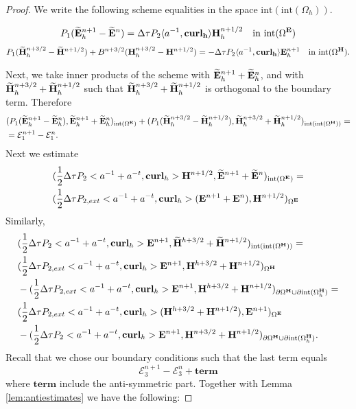 \documentclass[12pt,reqno]{amsart}
\newcommand{\curl}{{\bf curl}}
\newcommand{\acurl}{\langle a^{-1},{\bf curl_h}\rangle}
\newcommand{\e}{{\bf E}}
\newcommand{\h}{{\bf H}}
\theoremstyle{definition}
\numberwithin{equation}{section}
\newcommand{\intr}[1]{\mathrm{int}(#1)}
\def\Gw{\Omega}     \def\Gx{\Xi}         \def\Gy{\Psi}
\def\Gwh{\Omega_h}
\begin{document}
\begin{proof}
	
	We write the following scheme equalities in the space $\intr{\intr\Gwh}$.
	
	\begin{align}
		P_1(\widetilde{\e}_h^{n+1} -\widetilde{\e}^{n})=
		\Delta \tau P_2 \acurl \h_h^{n+1/2} \quad \mathrm{in} \  \intr{\Gw^\e}
	\end{align}
	\begin{align}
		P_1(\widetilde{\h}_h^{n+3/2} -\widetilde{\h}^{n+1/2})+
		B^{n+3/2}(\h_h^{n+3/2} -\h^{n+1/2})
		=
		-\Delta \tau P_2 \acurl \e_h^{n+1}  \quad \mathrm{in} \  \intr{\Gw^\h}.
	\end{align}
	

	
	Next, we take inner products of the scheme with $\widetilde{\e}_h^{n+1}+\widetilde{\e}_h^n$,
	and with 
	$\widetilde{\h}_h^{n+3/2}+\widetilde{\h}_h^{n+1/2}$ such that 
	$\widetilde{\h}_h^{n+3/2}+\widetilde{\h}_h^{n+1/2}$ is orthogonal to the boundary term.
	 Therefore
	\begin{align*}
		&
		(P_1(\widetilde{\e}^{n+1}_h-\widetilde{\e}^{n}_h),\widetilde{\e}^{n+1}_h+\widetilde{\e}^{n}_h)_{\intr{\Gw^\e}}+
		(P_1(\widetilde{\h}^{n+3/2}_h-\widetilde{\h}^{n+1/2}_h),\widetilde{\h}^{n+3/2}_h+\widetilde{\h}^{n+1/2}_h)_{\intr{\intr{\Gw^\h}}}=\\&
		=\mathcal{E}_1^{n+1}-\mathcal{E}_1^{n}.
	\end{align*}
	Next we estimate
	\begin{align*}
		&
		(\frac{1}{2}\Delta \tau P_2<a^{-1}+a^{-t},\curl_h>\h^{n+1/2},\widetilde{\e}^{n+1}+\widetilde{\e}^{n})_{ \intr{\Gw^\e}}=\\&
		(\frac{1}{2}\Delta \tau P_{2,ext}<a^{-1}+a^{-t},\curl_h>(\e^{n+1}+\e^{n}),\h^{n+1/2})_{ {\Gw^\e}}
	\end{align*}
	Similarly,
	\begin{align*}
		&
		(\frac{1}{2}\Delta \tau P_2<a^{-1}+a^{-t},\curl_h>\e^{n+1},\widetilde{\h}^{h+3/2}+\widetilde{\h}^{n+1/2})_{\intr{\intr{\Gw^\h}}}=\\&
		(\frac{1}{2}\Delta \tau P_{2,ext}<a^{-1}+a^{-t},\curl_h>\e^{n+1},\h^{h+3/2}+\h^{n+1/2})_{{\Gw^\h}}
		\\&
		-(\frac{1}{2}\Delta \tau P_{2,ext}<a^{-1}+a^{-t},\curl_h>\e^{n+1},\h^{h+3/2}+\h^{n+1/2})_{\partial{\Gw^\h}\cup \partial \intr{\Gwh^\h}}=\\&
		(\frac{1}{2}\Delta \tau P_{2,ext}<a^{-1}+a^{-t},\curl_h>(\h^{h+3/2}+\h^{n+1/2}),\e^{n+1})_{{{\Gw^\e}}}
		\\&
		-(\frac{1}{2}\Delta \tau P_{2}<a^{-1}+a^{-t},\curl_h>\e^{n+1},\h^{n+3/2}+\h^{n+1/2})_{\partial{\Gw^\h}\cup \partial \intr{\Gwh^\h}}.
	\end{align*}
	Recall that we chose our boundary conditions such that 
	the last term equals $$\mathcal{E}_3^{n+1}-\mathcal{E}_3^{n}+
	\mathbf{term}$$ where $\mathbf{term}$ include the anti-symmetric part.
	Together with Lemma \ref{lem:antiestimates} we have the following:


\end{proof}
\end{document}
